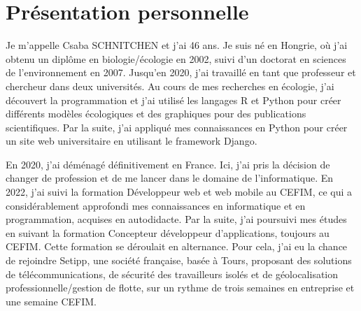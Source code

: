 \section{Présentation personnelle}\label{sec:presentation-personnelle}


Je m'appelle Csaba SCHNITCHEN et j'ai 46 ans. Je suis né en Hongrie, où j'ai obtenu un diplôme en biologie/écologie en 2002, suivi d'un doctorat en sciences de l'environnement en 2007. Jusqu'en 2020, j'ai travaillé en tant que professeur et chercheur dans deux universités. Au cours de mes recherches en écologie, j'ai découvert la programmation et j'ai utilisé les langages R et Python pour créer différents modèles écologiques et des graphiques pour des publications scientifiques. Par la suite, j'ai appliqué mes connaissances en Python pour créer un site web universitaire en utilisant le framework Django.

En 2020, j'ai déménagé définitivement en France. Ici, j'ai pris la décision de changer de profession et de me lancer dans le domaine de l'informatique. En 2022, j'ai suivi la formation Développeur web et web mobile au CEFIM, ce qui a considérablement approfondi mes connaissances en informatique et en programmation, acquises en autodidacte. Par la suite, j'ai poursuivi mes études en suivant la formation Concepteur développeur d'applications, toujours au CEFIM. Cette formation se déroulait en alternance. Pour cela, j'ai eu la chance de rejoindre Setipp, une société française, basée à Tours, proposant des solutions de télécommunications, de sécurité des travailleurs isolés et de géolocalisation professionnelle/gestion de flotte, sur un rythme de trois semaines en entreprise et une semaine CEFIM.